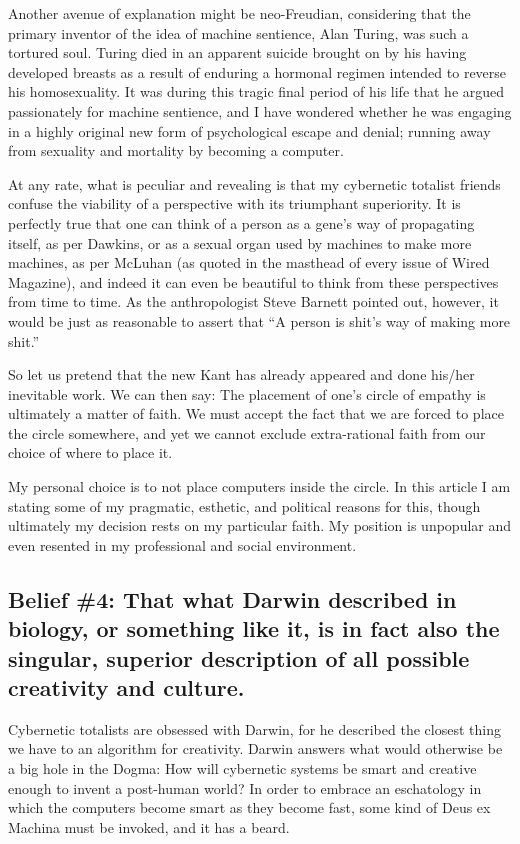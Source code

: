 \documentclass[letterpaper,12pt,english]{sphinxmanual}
\begin{document}
Another avenue of explanation might be neo-Freudian, considering that the primary inventor of the idea of machine sentience, Alan Turing, was such a tortured soul. Turing died in an apparent suicide brought on by his having developed breasts as a result of enduring a hormonal regimen intended to reverse his homosexuality. It was during this tragic final period of his life that he argued passionately for machine sentience, and I have wondered whether he was engaging in a highly original new form of psychological escape and denial; running away from sexuality and mortality by becoming a computer.

At any rate, what is peculiar and revealing is that my cybernetic totalist friends confuse the viability of a perspective with its triumphant superiority. It is perfectly true that one can think of a person as a gene's way of propagating itself, as per Dawkins, or as a sexual organ used by machines to make more machines, as per McLuhan (as quoted in the masthead of every issue of Wired Magazine), and indeed it can even be beautiful to think from these perspectives from time to time. As the anthropologist Steve Barnett pointed out, however, it would be just as reasonable to assert that ``A person is shit's way of making more shit.''

So let us pretend that the new Kant has already appeared and done his/her inevitable work. We can then say: The placement of one's circle of empathy is ultimately a matter of faith. We must accept the fact that we are forced to place the circle somewhere, and yet we cannot exclude extra-rational faith from our choice of where to place it.

My personal choice is to not place computers inside the circle. In this article I am stating some of my pragmatic, esthetic, and political reasons for this, though ultimately my decision rests on my particular faith. My position is unpopular and even resented in my professional and social environment.


\subsection{Belief \#4: \textbf{That what Darwin described in biology, or something like it, is in fact also the singular, superior description of all possible creativity and culture.}}
\label{lanier:belief-4-that-what-darwin-described-in-biology-or-something-like-it-is-in-fact-also-the-singular-superior-description-of-all-possible-creativity-and-culture}
Cybernetic totalists are obsessed with Darwin, for he described the closest thing we have to an algorithm for creativity. Darwin answers what would otherwise be a big hole in the Dogma: How will cybernetic systems be smart and creative enough to invent a post-human world? In order to embrace an eschatology in which the computers become smart as they become fast, some kind of Deus ex Machina must be invoked, and it has a beard.
\end{document}
